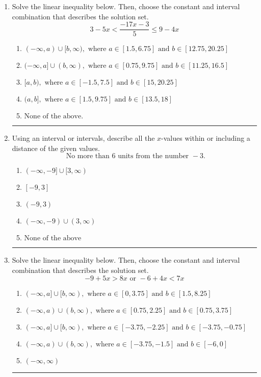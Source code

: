 \documentclass[14pt]{extbook}
\newcommand{\litem}[1]{\item#1\hspace*{-1cm}\rule{\textwidth}{0.4pt}}
\begin{document}
\begin{enumerate}
{\begin{enumerate}[label=\Alph*.]
\end{enumerate} }
\litem{
Solve the linear inequality below. Then, choose the constant and interval combination that describes the solution set.\[ 3 - 5 x < \frac{-17 x - 3}{5} \leq 9 - 4 x \]\begin{enumerate}[label=\Alph*.]
\item \( (-\infty, a) \cup [b, \infty), \text{ where } a \in [1.5, 6.75] \text{ and } b \in [12.75, 20.25] \)
\item \( (-\infty, a] \cup (b, \infty), \text{ where } a \in [0.75, 9.75] \text{ and } b \in [11.25, 16.5] \)
\item \( [a, b), \text{ where } a \in [-1.5, 7.5] \text{ and } b \in [15, 20.25] \)
\item \( (a, b], \text{ where } a \in [1.5, 9.75] \text{ and } b \in [13.5, 18] \)
\item \( \text{None of the above.} \)

\end{enumerate} }
\litem{
Using an interval or intervals, describe all the $x$-values within or including a distance of the given values.\[ \text{ No more than } 6 \text{ units from the number } -3. \]\begin{enumerate}[label=\Alph*.]
\item \( (-\infty, -9] \cup [3, \infty) \)
\item \( [-9, 3] \)
\item \( (-9, 3) \)
\item \( (-\infty, -9) \cup (3, \infty) \)
\item \( \text{None of the above} \)

\end{enumerate} }
\litem{
Solve the linear inequality below. Then, choose the constant and interval combination that describes the solution set.\[ -9 + 5 x > 8 x \text{ or } -6 + 4 x < 7 x \]\begin{enumerate}[label=\Alph*.]
\item \( (-\infty, a] \cup [b, \infty), \text{ where } a \in [0, 3.75] \text{ and } b \in [1.5, 8.25] \)
\item \( (-\infty, a) \cup (b, \infty), \text{ where } a \in [0.75, 2.25] \text{ and } b \in [0.75, 3.75] \)
\item \( (-\infty, a] \cup [b, \infty), \text{ where } a \in [-3.75, -2.25] \text{ and } b \in [-3.75, -0.75] \)
\item \( (-\infty, a) \cup (b, \infty), \text{ where } a \in [-3.75, -1.5] \text{ and } b \in [-6, 0] \)
\item \( (-\infty, \infty) \)


\end{enumerate}}
\end{enumerate}
\end{document}
